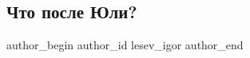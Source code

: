  
 
 
 
 
 
\subsection{Что после Юли?}
\label{sec:24_07_2018.fb.lesev_igor.1.chto_posle_juli}
 
\ifcmt
 author_begin
   author_id lesev_igor
 author_end
\fi

